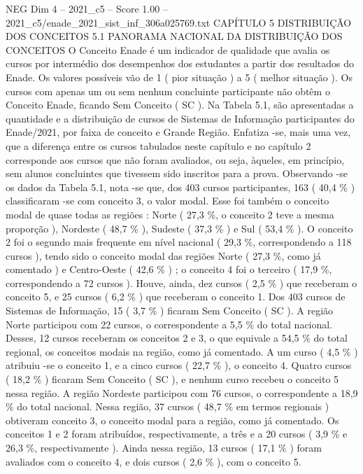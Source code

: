 \begin{textsample}{NEG Dim 4 – 2021\_c5 – Score 1.00 – 2021\_c5/enade\_2021\_sist\_inf\_306a025769.txt}  \label{ex:f4_neg_143}
CAPÍTULO 5 DISTRIBUIÇÃO DOS CONCEITOS 5.1 PANORAMA NACIONAL DA DISTRIBUIÇÃO DOS CONCEITOS O Conceito Enade é um indicador de qualidade que avalia os cursos por intermédio dos desempenhos dos estudantes a partir dos resultados do Enade.
Os valores possíveis vão de 1 ( pior situação ) a 5 ( melhor situação ).
Os cursos com apenas um ou sem nenhum concluinte participante não obtêm o Conceito Enade, ficando Sem Conceito ( SC ).
Na Tabela 5.1, são apresentadas a quantidade e a distribuição de cursos de Sistemas de Informação participantes do Enade/2021, por faixa de conceito e Grande Região.
Enfatiza -se, mais uma vez, que a diferença entre os cursos tabulados neste capítulo e no capítulo 2 corresponde aos cursos que não foram avaliados, ou seja, àqueles, em princípio, sem alunos concluintes que tivessem sido inscritos para a prova.
Observando -se os dados da Tabela 5.1, nota -se que, dos 403 cursos participantes, 163 ( 40,4 \% ) classificaram -se com conceito 3, o valor modal.
Esse foi também o conceito modal de quase todas as regiões : Norte ( 27,3 \%, o conceito 2 teve a mesma proporção ), Nordeste ( 48,7 \% ), Sudeste ( 37,3 \% ) e Sul ( 53,4 \% ).
O conceito 2 foi o segundo mais frequente em nível nacional ( 29,3 \%, correspondendo a 118 cursos ), tendo sido o conceito modal das regiões Norte ( 27,3 \%, como já comentado ) e Centro-Oeste ( 42,6 \% ) ; o conceito 4 foi o terceiro ( 17,9 \%, correspondendo a 72 cursos ).
Houve, ainda, dez cursos ( 2,5 \% ) que receberam o conceito 5, e 25 cursos ( 6,2 \% ) que receberam o conceito 1.
Dos 403 cursos de Sistemas de Informação, 15 ( 3,7 \% ) ficaram Sem Conceito ( SC ).
A região Norte participou com 22 cursos, o correspondente a 5,5 \% do total nacional.
Desses, 12 cursos receberam os conceitos 2 e 3, o que equivale a 54,5 \% do total regional, os conceitos modais na região, como já comentado.
A um curso ( 4,5 \% ) atribuiu -se o conceito 1, e a cinco cursos ( 22,7 \% ), o conceito 4.
Quatro cursos ( 18,2 \% ) ficaram Sem Conceito ( SC ), e nenhum curso recebeu o conceito 5 nessa região.
A região Nordeste participou com 76 cursos, o correspondente a 18,9 \% do total nacional.
Nessa região, 37 cursos ( 48,7 \% em termos regionais ) obtiveram conceito 3, o conceito modal para a região, como já comentado.
Os conceitos 1 e 2 foram atribuídos, respectivamente, a três e a 20 cursos ( 3,9 \% e 26,3 \%, respectivamente ).
Ainda nessa região, 13 cursos ( 17,1 \% ) foram avaliados com o conceito 4, e dois cursos ( 2,6 \% ), com o conceito 5.

\end{textsample}
